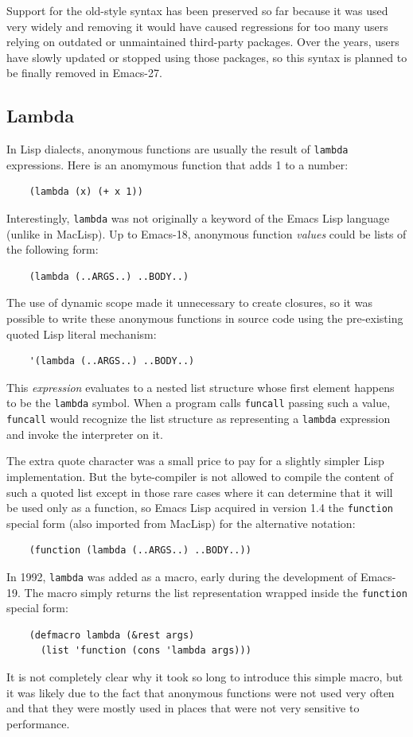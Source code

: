 \documentclass[format=acmsmall, review]{acmart}
\newcommand \Elisp {Emacs Lisp}
\begin{document}
Support for the old-style syntax has been preserved so far because it was
used very widely and removing it would have caused regressions for too many
users relying on outdated or unmaintained third-party packages.  Over the
years, users have slowly updated or stopped using those packages, so this
syntax is planned to be finally removed in Emacs-27.

\subsection{Lambda}
\label{sec:lambda}

In Lisp dialects, anonymous functions are usually the result of
\texttt{lambda} expressions.  Here is an anomymous function that adds
1 to a number:
%
\begin{verbatim}
    (lambda (x) (+ x 1))
\end{verbatim}
%
Interestingly, \texttt{lambda} was not originally a keyword of the
\Elisp{} language (unlike in MacLisp).  Up to Emacs-18, anonymous
function \emph{values} could be lists of the following form:
%
\begin{verbatim}
    (lambda (..ARGS..) ..BODY..)
\end{verbatim}
%
The use of dynamic scope made it unnecessary to create closures, so it was
possible to write these anonymous functions in source code using the
pre-existing quoted Lisp literal mechanism:
%
\begin{verbatim}
    '(lambda (..ARGS..) ..BODY..)
\end{verbatim}
%
This \emph{expression} evaluates to a nested list structure whose first
element happens to be the \texttt{lambda} symbol.  When a program calls
\texttt{funcall} passing such a value, \texttt{funcall} would
recognize the list structure as representing a \texttt{lambda}
expression and invoke the interpreter on it.

The extra quote character was a small price to pay for a slightly simpler
Lisp implementation.  But the byte-compiler is not allowed to compile the
content of such a quoted list except in those rare cases where it can
determine that it will be used only as a function, so \Elisp{} acquired in
version 1.4 the \texttt{function} special form (also imported from MacLisp)
for the alternative notation:
%
\begin{verbatim}
    (function (lambda (..ARGS..) ..BODY..))
\end{verbatim}
%
In 1992, \texttt{lambda} was added as a macro, early during the
development of Emacs-19.  The macro simply returns the list representation
wrapped inside the \texttt{function} special form:
\begin{verbatim}
    (defmacro lambda (&rest args)
      (list 'function (cons 'lambda args)))
\end{verbatim}
It is not completely
clear why it took so long to introduce this simple macro, but it was likely
due to the fact that anonymous functions were not used very often and that
they were mostly used in places that were not very sensitive to performance.
\end{document}
